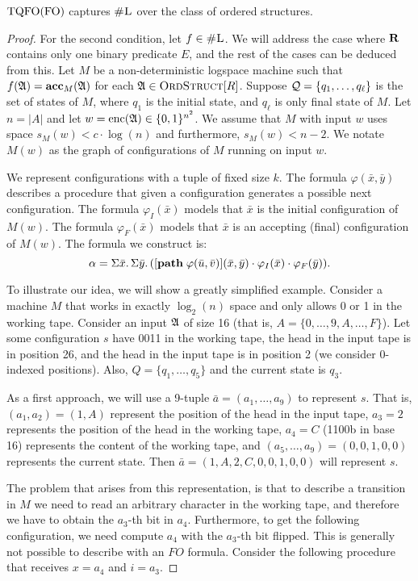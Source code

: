 \begin{theorem}
	${\rm TQFO}({\rm FO})$ captures $\text{\sc \#L}$ over the class of ordered structures.
\end{theorem}
\begin{proof}
	For the second condition, let $f \in \text{\sc \#L}$. We will address the case where $\mathbf{R}$ contains only one binary predicate $E$, and the rest of the cases can be deduced from this. Let $M$ be a non-deterministic logspace machine such that $f(\mathfrak{A}) = \textbf{acc}_M(\mathfrak{A})$ for each $\mathfrak{A} \in \text{\sc OrdStruct}[R]$. Suppose ${\cal Q} = \{q_1,\ldots,q_{\ell}\}$ is the set of states of $M$, where $q_1$ is the initial state, and $q_{\ell}$ is only final state of $M$. Let $n = \vert A \vert$ and let $w = {\rm enc}(\mathfrak{A}) \in \{0,1\}^{n^2}$. We assume that $M$ with input $w$ uses space $s_M(w) < c\cdot\log(n)$ and furthermore, $s_M(w) < n-2$. We notate $M(w)$ as the graph of configurations of $M$ running on input $w$.
	
	We represent configurations with a tuple of fixed size $k$. The formula $\varphi(\bar{x},\bar{y})$ describes a procedure that given a configuration generates a possible next configuration. The formula $\varphi_I(\bar{x})$ models that $\bar{x}$ is the initial configuration of $M(w)$. The formula $\varphi_F(\bar{x})$ models that $\bar{x}$ is an accepting (final) configuration of $M(w)$. The formula we construct is:
	$$
	\alpha = \Sigma{\bar{x}}.\,\Sigma{\bar{y}}.\,([{\bf path} \; \varphi(\bar{u},\bar{v})](\bar{x},\bar{y})\cdot \varphi_I(\bar{x})\cdot\varphi_F(\bar{y})).
	$$
	
	To illustrate our idea, we will show a greatly simplified example. Consider a machine $M$ that works in exactly $\log_2(n)$ space and only allows 0 or 1 in the working tape. Consider an input $\mathfrak{A}$ of size 16 (that is, $A = \{0,\ldots,9,A,\ldots,F\}$). Let some configuration $s$ have 0011 in the working tape, the head in the input tape is in position 26, and the head in the input tape is in position 2 (we consider 0-indexed positions). Also, $Q = \{q_1,\ldots,q_5\}$ and the current state is $q_3$.
	
	As a first approach, we will use a 9-tuple $\bar{a} = (a_1,\ldots,a_9)$ to represent $s$. That is, $(a_1,a_2) = (1,A)$ represent the position of the head in the input tape, $a_3 = 2$ represents the position of the head in the working tape, $a_4 = C$ (1100b in base 16) represents the content of the working tape, and $(a_5,\ldots,a_9) = (0,0,1,0,0)$ represents the current state. Then $\bar{a} = (1,A,2,C,0,0,1,0,0)$ will represent $s$.
	
	The problem that arises from this representation, is that to describe a transition in $M$ we need to read an arbitrary character in the working tape, and therefore we have to obtain the $a_3$-th bit in $a_4$. Furthermore, to get the following configuration, we need compute $a_4$ with the $a_3$-th bit flipped. This is generally not possible to describe with an $FO$ formula. Consider the following procedure that receives $x = a_4$ and $i = a_3$.
	

\end{proof}
